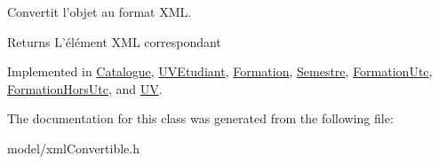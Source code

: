 Convertit l'objet au format X\+M\+L. 

\begin{DoxyReturn}{Returns}
L'élément X\+M\+L correspondant 
\end{DoxyReturn}


Implemented in \hyperlink{classCatalogue_a12f412e8ba3dd8b950fc1f7dd8608f51}{Catalogue}, \hyperlink{classUVEtudiant_a4a4aef90cdc3207ccab922d1b8b38334}{U\+V\+Etudiant}, \hyperlink{classFormation_aea1a12114f435bba6a32a0a32ca32e47}{Formation}, \hyperlink{classSemestre_a36272015189e8641d0a736f99981b876}{Semestre}, \hyperlink{classFormationUtc_a8dcda30820484cd00e82ad53a1b313f9}{Formation\+Utc}, \hyperlink{classFormationHorsUtc_ab7f0cb9fcecf0423b257d1011e7d8623}{Formation\+Hors\+Utc}, and \hyperlink{classUV_a2b60d0325f1117f3228f8ff32667e860}{U\+V}.



The documentation for this class was generated from the following file\+:\begin{DoxyCompactItemize}
\item 
model/xml\+Convertible.\+h\end{DoxyCompactItemize}
